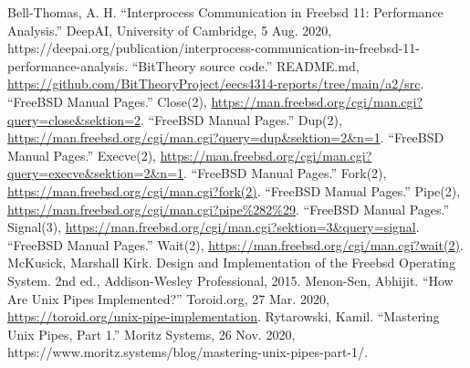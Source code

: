 \documentclass[12pt, dvipsnames, a4paper]{article}
\begin{document}
\begin{thebibliography}{00}
	 Bell-Thomas, A. H. “Interprocess Communication in Freebsd 11: Performance Analysis.” DeepAI, University of Cambridge, 5 Aug. 2020, https://deepai.org/publication/interprocess-communication-in-freebsd-11-performance-analysis.
	 “BitTheory source code.” README.md, \href{https://github.com/BitTheoryProject/eecs4314-reports/tree/main/a2/src}{https://github.com/BitTheoryProject/eecs4314-reports/tree/main/a2/src}.
	 “FreeBSD Manual Pages.” Close(2), \href{https://man.freebsd.org/cgi/man.cgi?query=close\&sektion=2}{https://man.freebsd.org/cgi/man.cgi?query=close\&sektion=2}.
	 “FreeBSD Manual Pages.” Dup(2), \href{https://man.freebsd.org/cgi/man.cgi?query=dup\&sektion=2\&n=1}{https://man.freebsd.org/cgi/man.cgi?query=dup\&sektion=2\&n=1}.
	 “FreeBSD Manual Pages.” Execve(2), \href{https://man.freebsd.org/cgi/man.cgi?query=execve\&sektion=2\&n=1}{https://man.freebsd.org/cgi/man.cgi?query=execve\&sektion=2\&n=1}.
	 “FreeBSD Manual Pages.” Fork(2), \href{https://man.freebsd.org/cgi/man.cgi?fork(2)}{https://man.freebsd.org/cgi/man.cgi?fork(2)}.
	 “FreeBSD Manual Pages.” Pipe(2), \href{https://man.freebsd.org/cgi/man.cgi?pipe\%282\%29}{https://man.freebsd.org/cgi/man.cgi?pipe\%282\%29}.
	 “FreeBSD Manual Pages.” Signal(3), \href{https://man.freebsd.org/cgi/man.cgi?sektion=3\&query=signal}{https://man.freebsd.org/cgi/man.cgi?sektion=3\&query=signal}.
	 “FreeBSD Manual Pages.” Wait(2), \href{https://man.freebsd.org/cgi/man.cgi?wait(2)}{https://man.freebsd.org/cgi/man.cgi?wait(2)}.
	 McKusick, Marshall Kirk. Design and Implementation of the Freebsd Operating System. 2nd ed., Addison-Wesley Professional, 2015.
	 Menon-Sen, Abhijit. “How Are Unix Pipes Implemented?” Toroid.org, 27 Mar. 2020, \href{https://toroid.org/unix-pipe-implementation}{https://toroid.org/unix-pipe-implementation}.
	Rytarowski, Kamil. “Mastering Unix Pipes, Part 1.” Moritz Systems, 26 Nov. 2020, https://www.moritz.systems/blog/mastering-unix-pipes-part-1/.
\end{thebibliography}
\end{document}
